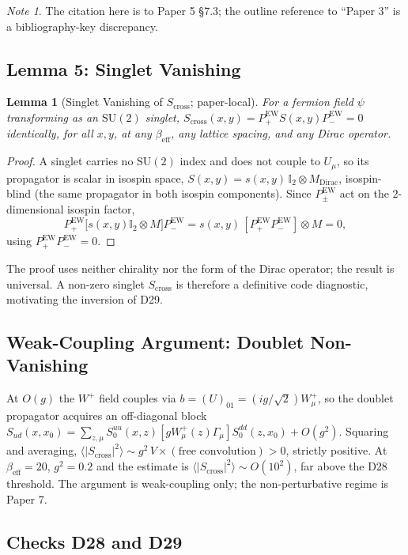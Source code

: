 \documentclass[11pt,a4paper]{article}
\theoremstyle{plain}
\newtheorem{lemma}{Lemma}
\theoremstyle{definition}
\theoremstyle{remark}
\newtheorem*{note}{Note}
\newcommand{\SU}{\mathrm{SU}}
\newcommand{\Scross}{S_{\mathrm{cross}}}
\newcommand{\be}{\beta_{\mathrm{eff}}}
\newcommand{\Pew}{P^{\mathrm{EW}}}
\newcommand{\Id}{\mathbb{I}}
\begin{document}
\begin{note}
The citation here is to Paper 5 \S7.3; the outline reference to
``Paper 3'' is a bibliography-key discrepancy.
\end{note}

\subsection{Lemma 5: Singlet Vanishing}
\label{ssec:lemma5}

\setcounter{lemma}{4}
\begin{lemma}[Singlet Vanishing of $\Scross$; paper-local]
For a fermion field $\psi$ transforming as an $\SU(2)$ singlet,
$\Scross(x,y)=\Pew_{+}S(x,y)\Pew_{-}=0$ identically, for all $x,y$, at
any $\be$, any lattice spacing, and any Dirac operator.
\end{lemma}

\begin{proof}
A singlet carries no $\SU(2)$ index and does not couple to $U_\mu$, so
its propagator is scalar in isospin space,
$S(x,y)=s(x,y)\,\Id_2\otimes M_{\mathrm{Dirac}}$, isospin-blind (the same
propagator in both isospin components). Since $\Pew_{\pm}$ act on the
$2$-dimensional isospin factor,
\[
  \Pew_{+}\bigl[s(x,y)\Id_2\otimes M\bigr]\Pew_{-}
  =s(x,y)\,[\Pew_{+}\Pew_{-}]\otimes M=0,
\]
using $\Pew_{+}\Pew_{-}=0$.
\end{proof}

\noindent
The proof uses neither chirality nor the form of the Dirac operator; the
result is universal. A non-zero singlet $\Scross$ is therefore a
definitive code diagnostic, motivating the inversion of D29.

\subsection{Weak-Coupling Argument: Doublet Non-Vanishing}
\label{ssec:doublet}

At $O(g)$ the $W^{+}$ field couples via $b=(U)_{01}=(ig/\sqrt2)W^{+}_\mu$,
so the doublet propagator acquires an off-diagonal block
$S_{ud}(x,x_0)=\sum_{z,\mu}S_0^{uu}(x,z)[gW^{+}_\mu(z)\Gamma_\mu]
S_0^{dd}(z,x_0)+O(g^2)$. Squaring and averaging,
$\langle|\Scross|^2\rangle\sim g^2\,V\times(\text{free convolution})>0$,
strictly positive. At $\be=20$, $g^2=0.2$ and the estimate is
$\langle|\Scross|^2\rangle\sim O(10^2)$, far above the D28 threshold. The
argument is weak-coupling only; the non-perturbative regime is Paper 7.

\subsection{Checks D28 and D29}
\label{ssec:D28D29}
\end{document}
